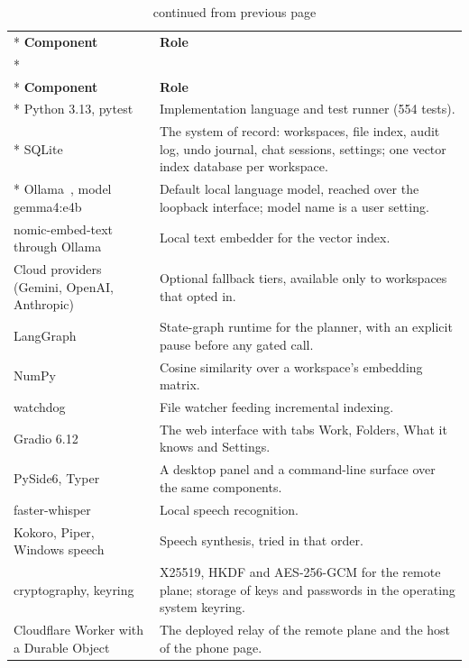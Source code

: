 \documentclass{FastFyp}
\begin{document}
{
\begin{longtable}{|p{4.2cm}|p{9.2cm}|}
\caption{Platform, libraries and services.}\label{tab:platform}\\*
\hline
\textbf{Component} & \textbf{Role} \\*
\hline
\endfirsthead
\caption[]{continued from previous page}\\*
\hline
\textbf{Component} & \textbf{Role} \\*
\hline
\endhead
\hline
Python 3.13, pytest & Implementation language and test runner (554 tests). \\*
\hline
SQLite~\cite{ref:sqlite} & The system of record: workspaces, file index, audit log, undo journal, chat sessions, settings; one vector index database per workspace. \\*
\hline
Ollama~\cite{ref:ollama}, model gemma4:e4b & Default local language model, reached over the loopback interface; model name is a user setting. \\
\hline
nomic-embed-text through Ollama & Local text embedder for the vector index. \\
\hline
Cloud providers (Gemini, OpenAI, Anthropic) & Optional fallback tiers, available only to workspaces that opted in. \\
\hline
LangGraph~\cite{ref:langgraph} & State-graph runtime for the planner, with an explicit pause before any gated call. \\
\hline
NumPy & Cosine similarity over a workspace's embedding matrix. \\
\hline
watchdog & File watcher feeding incremental indexing. \\
\hline
Gradio 6.12 & The web interface with tabs Work, Folders, What it knows and Settings. \\
\hline
PySide6, Typer & A desktop panel and a command-line surface over the same components. \\
\hline
faster-whisper & Local speech recognition. \\
\hline
Kokoro, Piper, Windows speech & Speech synthesis, tried in that order. \\
\hline
cryptography, keyring & X25519, HKDF and AES-256-GCM for the remote plane; storage of keys and passwords in the operating system keyring. \\
\hline
Cloudflare Worker with a Durable Object & The deployed relay of the remote plane and the host of the phone page. \\
\hline
\end{longtable}
}
\end{document}
